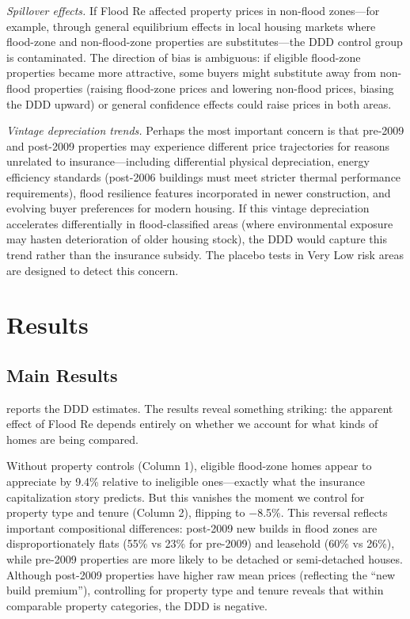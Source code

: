 \documentclass[12pt]{article}
\begin{document}
\textit{Spillover effects.} If Flood Re affected property prices in non-flood zones---for example, through general equilibrium effects in local housing markets where flood-zone and non-flood-zone properties are substitutes---the DDD control group is contaminated. The direction of bias is ambiguous: if eligible flood-zone properties became more attractive, some buyers might substitute away from non-flood properties (raising flood-zone prices and lowering non-flood prices, biasing the DDD upward) or general confidence effects could raise prices in both areas.

\textit{Vintage depreciation trends.} Perhaps the most important concern is that pre-2009 and post-2009 properties may experience different price trajectories for reasons unrelated to insurance---including differential physical depreciation, energy efficiency standards (post-2006 buildings must meet stricter thermal performance requirements), flood resilience features incorporated in newer construction, and evolving buyer preferences for modern housing. If this vintage depreciation accelerates differentially in flood-classified areas (where environmental exposure may hasten deterioration of older housing stock), the DDD would capture this trend rather than the insurance subsidy. The placebo tests in Very Low risk areas are designed to detect this concern.


\section{Results}
\label{sec:results}

\subsection{Main Results}



 reports the DDD estimates. The results reveal something striking: the apparent effect of Flood Re depends entirely on whether we account for what kinds of homes are being compared.

Without property controls (Column 1), eligible flood-zone homes appear to appreciate by 9.4\% relative to ineligible ones---exactly what the insurance capitalization story predicts. But this vanishes the moment we control for property type and tenure (Column 2), flipping to $-$8.5\%. This reversal reflects important compositional differences: post-2009 new builds in flood zones are disproportionately flats (55\% vs 23\% for pre-2009) and leasehold (60\% vs 26\%), while pre-2009 properties are more likely to be detached or semi-detached houses. Although post-2009 properties have higher raw mean prices (reflecting the ``new build premium''), controlling for property type and tenure reveals that within comparable property categories, the DDD is negative.
\end{document}
